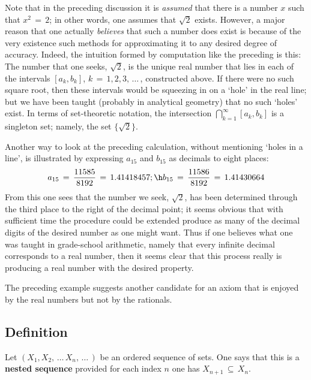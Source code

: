         Note that in the preceding discussion it is {\em assumed} that there is a number $x$ such that $x^{2} \,=\, 2$;
    in other words, one assumes that $\sqrt{2}$ exists. However, a major reason that one actually
    {\em believes} that such a number does exist is because of the very existence such methods for approximating it to any desired degree of accuracy.
    Indeed, the intuition formed by computation like the preceding is this: The number that one seeks, $\sqrt{2}$,
    is the unique real number that lies in each of the intervals $[a_{k},b_{k}]$, $k \,=\, 1,2,3,\,{\ldots}\,$, constructed above.
    If there were no such square root, then these intervals would be squeezing in on a `hole' in the real line;
    but we have been taught (probably in analytical geometry) that no such `holes' exist.
    In terms of set-theoretic notation, the intersection ${\bigcap}_{k=1}^{{\infty}} [a_{k},b_{k}]$ is a singleton set; namely, the set $\{\sqrt{2}\}$.

        Another way to look at the preceding calculation, without mentioning `holes in a line', is illustrated by expressing $a_{15}$ and $b_{15}$ as decimals to eight places:
        \begin{displaymath}
        a_{15} \,=\, \frac{11585}{8192} \,=\, 1.41418457; \h
        b_{15} \,=\, \frac{11586}{8192} \,=\, 1.41430664
        \end{displaymath}
    From this one sees that the number we seek, $\sqrt{2}$, has been determined through the third place to the right of the decimal point;
    it seems obvious that with sufficient time the procedure could be extended produce as many of the decimal digits of the desired number as one might want.
    Thus if one believes what one was taught in grade-school arithmetic, namely that every infinite decimal corresponds to a real number,
    then it seems clear that this process really is producing a real number with the desired property.



        The preceding example suggests another candidate for an axiom that is enjoyed by the real numbers but not by the rationals.


\V

            \subsection{\small{\bf Definition}}
            \label{DefB30.05A}
\V

        \hspace*{\parindent}Let $(X_{1}, X_{2},\,{\ldots}\,X_{n},\,{\ldots}\,)$ be an ordered sequence of sets.
    One says that this is a {\bf nested sequence} provided for each index $n$ one has $X_{n+1} \,{\subseteq}\, X_{n}$.

